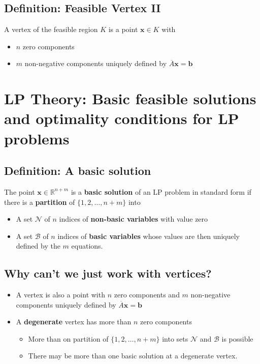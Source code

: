 \documentclass[11pt,a4paper]{article}
\begin{document}
\subsection*{Definition: Feasible Vertex II}
A vertex of the feasible region $K$ is a point $\textbf{x} \in K$ with
\begin{itemize}
	\item $n$ zero components
	\item $m$ non-negative components uniquely defined by $\overline{A}\textbf{x} = \textbf{b}$
\end{itemize}

\section*{LP Theory: Basic feasible solutions and optimality conditions for LP problems}
\subsection*{Definition: A basic solution}
The point $\textbf{x} \in \mathbb{R}^{n+m}$ is a \textbf{basic solution} of an LP problem in standard form if there is a \textbf{partition} of $\{1, 2, \ldots, n+m\}$ into
\begin{itemize}
	\item A set $\mathcal{N}$ of $n$ indices of \textbf{non-basic variables} with value zero
	\item A set $\mathcal{B}$ of $n$ indices of \textbf{basic variables} whose values are then uniquely defined by the $m$ equations.
\end{itemize}

\subsection*{Why can't we just work with vertices?}
\begin{itemize}
	\item A vertex is also a point with $n$ zero components and $m$ non-negative components uniquely defined by $\overline{A}\textbf{x} = \textbf{b}$
	\item A \textbf{degenerate} vertex has more than $n$ zero components
		\begin{itemize}
			\item More than on partition of $\{1, 2, \ldots, n+m\}$ into sets $\mathcal{N}$ and $\mathcal{B}$ is possible
			\item There may be more than one basic solution at a degenerate vertex.
		\end{itemize}
\end{itemize}
\end{document}
